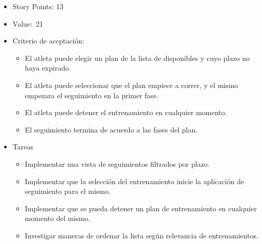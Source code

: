 \begin{enumerate}
  \begin{itemize}
  \item
    Story Points: 13
  \item
    Value:~21
  \item
    Criterio de aceptación:

    \begin{itemize}
    \item
      El atleta puede elegir un plan de la lista de disponibles y cuyo
      plazo no haya expirado.
    \item
      El atleta puede seleccionar que el plan empiece a correr, y el
      mismo empezara el seguimiento en la primer fase.
    \item
      El atleta puede detener el entrenamiento en cualquier momento.
    \item
      El seguimiento termina de acuerdo a las fases del plan.
    \end{itemize}
  \item
    Tareas

    \begin{itemize}
    \item
      Implementar una vista de seguimientos filtrados por plazo.
    \item
      Implementar que la selección del entrenamiento inicie la
      aplicación de seguimiento para el mismo.
    \item
      Implementar que se pueda detener un plan de entrenamiento en
      cualquier momento del mismo.
    \item
      Investigar maneras de ordenar la lista según relevancia de
      entrenamientos.
    \end{itemize}
  \end{itemize}
\end{enumerate}
